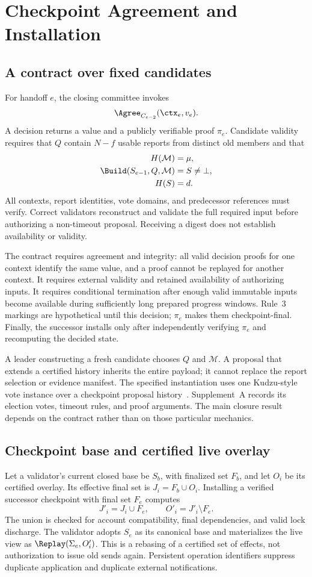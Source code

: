 \section{Checkpoint Agreement and Installation}
\label{sec:agreement}
\subsection{A contract over fixed candidates}
For handoff $e$, the closing committee invokes
\[
\Agree_{C_{e-2}}(\ctx_e,v_e).
\]
A decision returns a value and a publicly verifiable proof $\pi_e$. Candidate validity requires that $Q$ contain $N-f$ usable reports from distinct old members and that
\begin{align*}
H(\mathcal M)&=\mu,\\
\Build(S_{e-1},Q,\mathcal M)&=S\neq\bot,\\
H(S)&=d.
\end{align*}
All contexts, report identities, vote domains, and predecessor references must verify. Correct validators reconstruct and validate the full required input before authorizing a non-timeout proposal. Receiving a digest does not establish availability or validity.

The contract requires agreement and integrity: all valid decision proofs for one context identify the same value, and a proof cannot be replayed for another context. It requires external validity and retained availability of authorizing inputs. It requires conditional termination after enough valid immutable inputs become available during sufficiently long prepared progress windows. Rule~3 markings are hypothetical until this decision; $\pi_e$ makes them checkpoint-final. Finally, the successor installs only after independently verifying $\pi_e$ and recomputing the decided state.

A leader constructing a fresh candidate chooses $Q$ and $\mathcal M$. A proposal that extends a certified history inherits the entire payload; it cannot replace the report selection or evidence manifest. The specified instantiation uses one Kudzu-style vote instance over a checkpoint proposal history~\cite{kudzu}. Supplement~A records its election votes, timeout rules, and proof arguments. The main closure result depends on the contract rather than on those particular mechanics.

\subsection{Checkpoint base and certified live overlay}
\label{sec:install}
Let a validator's current closed base be $S_b$, with finalized set $F_b$, and let $O_i$ be its certified overlay. Its effective final set is $J_i=F_b\cup O_i$. Installing a verified successor checkpoint with final set $F_e$ computes
\[
J'_i=J_i\cup F_e,\qquad O'_i=J'_i\setminus F_e.
\]
The union is checked for account compatibility, final dependencies, and valid lock discharge. The validator adopts $S_e$ as its canonical base and materializes the live view as $\Replay(\Sigma_e,O'_i)$. This is a rebasing of a certified set of effects, not authorization to issue old sends again. Persistent operation identifiers suppress duplicate application and duplicate external notifications.

